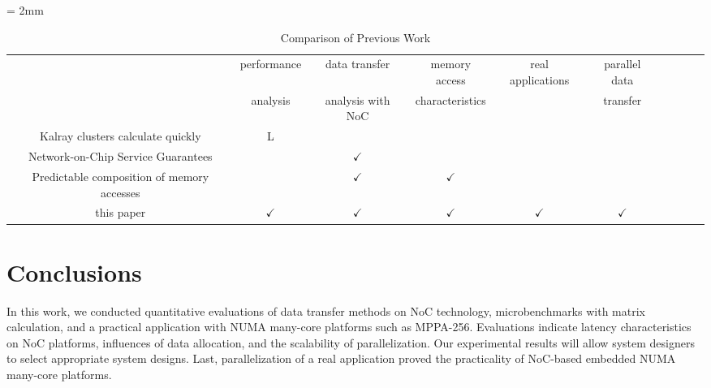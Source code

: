   \begin{table}[t]
    \caption{\label{tb:comparison_relatedwork}
      Comparison of Previous Work}
    \centering
    \scriptsize	                    %
    \tabcolsep = 2mm              %
    \begin{tabular}{c|ccccccccc}
      \hline
      & performance & data transfer & memory access & \multirow{2}{*}{real applications} & parallel data & \\
      & analysis & analysis with NoC & characteristics & & transfer & \\
      \hline
      \hline
      Kalray clusters calculate quickly \cite{kanter2015kalray} & L &  &  &  &  & \\
      Network-on-Chip Service Guarantees \cite{denet2017work} &  & \(\checkmark\) &  &  &  & \\
      Predictable composition of memory accesses \cite{perret2016predictable} &  & \(\checkmark\) & \(\checkmark\) &  &  & \\
      this paper & \(\checkmark\) & \(\checkmark\) & \(\checkmark\) & \(\checkmark\) & \(\checkmark\) & \\
      \hline
    \end{tabular}
  \end{table}
  
  \chapter{Conclusions}
  \label{sec:conclusion}
  In this work, we conducted quantitative evaluations of data transfer methods on NoC technology, microbenchmarks with matrix calculation, and a practical application with NUMA many-core platforms such as MPPA-256.
  Evaluations indicate latency characteristics on NoC platforms, influences of data allocation, and the scalability of parallelization.
  Our experimental results will allow system designers to select appropriate system designs.
  Last, parallelization of a real application proved the practicality of NoC-based embedded NUMA many-core platforms.
  
